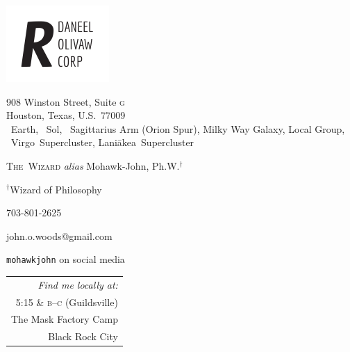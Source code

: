 \documentclass[10pt,twoside,openany]{article}
\begin{document}
\hspace{-1.6em}
\begin{minipage}{0.44\textwidth}
\includegraphics[scale=1.5]{r_daneel_olivaw.pdf}
\end{minipage}\hfill
\begin{minipage}{0.5\textwidth}
\vspace{0.2em}
908 Winston Street, Suite \textsc{g} \\
Houston, Texas, U.S.\ 77009 \\
\small \Earth\ Earth, \Sun\ Sol, \footnotesize \Sagittarius\ Sagittarius Arm (Orion Spur), \scriptsize Milky Way Galaxy, Local Group, \tiny \Virgo\ Virgo~Supercluster, Lani\={a}kea~Supercluster
\end{minipage}
\vspace{-0.8em}
\par\textsc{\Large The~Wizard} \textit{alias} Mohawk-John, Ph.W.${}^\dagger$

\begin{minipage}{0.51\textwidth}
\par {\scriptsize${}^\dagger$Wizard of Philosophy}
\vspace{0.5em}
\par \small 703-801-2625
\par \small john.o.woods@gmail.com
\par \small\texttt{mohawkjohn} on social media
\\
\end{minipage}\hfill
\begin{minipage}{0.43\textwidth}\footnotesize
\begin{tabularx}{0.54\textwidth}{r}
\textit{Find me locally at:} \\
5:15 \& \textsc{b--c} (Guildsville)\\
The Mask Factory Camp \\
Black Rock City
\end{tabularx}
\end{minipage}
\end{document}
